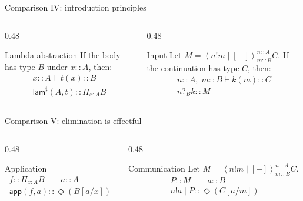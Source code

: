 \documentclass[aspectratio=169,11pt]{beamer}
\newcommand{\ty}{\mathrel{::}}
\newcommand{\app}{\mathsf{app}}
\newcommand{\Lam}{\mathsf{lam}^{\sharp}}
\newcommand{\Dia}{\Diamond}
\newcommand{\hole}{[-]}
\newcommand{\Mod}[4]{\left\langle #1\right\rangle^{#2}_{#3} #4}
\begin{document}
\begin{frame}{Comparison IV: introduction principles}
\small
\begin{columns}[T]
\begin{column}{0.48\textwidth}
\begin{block}{Lambda abstraction}
If the body has type \(B\) under \(x\ty A\), then:
\[
\begin{array}{c}
  x\ty A \vdash t(x)\ty B\\[2pt]
  \hline
  \Lam(A,t)\ty \Pi_{x:A}B
\end{array}
\]
\end{block}

\end{column}
\begin{column}{0.48\textwidth}
\begin{block}{Input}
Let \(M=\Mod{n!m\mid\hole}{n\ty A}{m\ty B}{C}\). If the continuation has type \(C\), then:
\[
\begin{array}{c}
  n\ty A,\;m\ty B \vdash k(m)\ty C\\[2pt]
  \hline
  n?_B k\ty M
\end{array}
\]
\end{block}
\end{column}
\end{columns}
\end{frame}

\begin{frame}{Comparison V: elimination is effectful}
\small
\begin{columns}[T]
\begin{column}{0.48\textwidth}
\begin{block}{Application}
\[
\begin{array}{c}
  f\ty \Pi_{x:A}B \qquad a\ty A\\[2pt]
  \hline
  \app(f,a)\ty\Dia(B[a/x])
\end{array}
\]
\end{block}

\end{column}
\begin{column}{0.48\textwidth}
\begin{block}{Communication}
Let \(M=\Mod{n!m\mid\hole}{n\ty A}{m\ty B}{C}\).
\[
\begin{array}{c}
  P\ty M \qquad a\ty B\\[2pt]
  \hline
  n!a\mid P\ty\Dia(C[a/m])
\end{array}
\]
\end{block}
\end{column}
\end{columns}

\end{frame}
\end{document}
